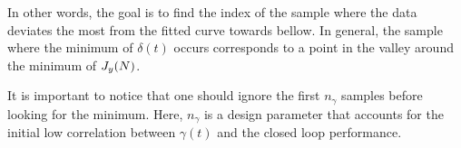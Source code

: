 In other words, the goal is to find the index of the sample where the data deviates the most from the fitted curve towards bellow.
In general, the sample where the minimum of $\delta(t)$ occurs corresponds to a point in the valley around the minimum of $J_y(N)$.

It is important to notice that one should ignore the first $n_\gamma$ samples before looking for the minimum.
Here, $n_\gamma$ is a design parameter that accounts for the initial low correlation between $\gamma(t)$ and the closed loop performance.
